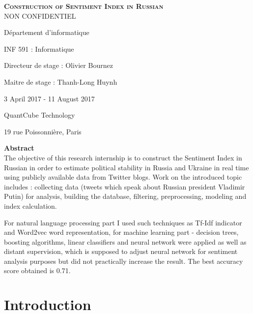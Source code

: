 \documentclass[12pt,a4paper]{article}
\begin{document}
\begin{titlepage}
\begin{center}
\textsc{\Large \textbf{Construction of Sentiment Index in Russian}} \\[1cm] 
\textsc{\LARGE NON CONFIDENTIEL}\\[3.5cm]
\end{center}

Département d’informatique

INF 591 : Informatique

Directeur de stage : Olivier Bournez

Maitre de stage : Thanh-Long Huynh

3 April 2017 - 11 August 2017

QuantCube Technology

19 rue Poissonnière, Paris
\end{titlepage}

\large \textbf{Abstract} \\[0.1cm] %

The objective of this research internship is to construct the Sentiment Index in Russian in order to estimate political stability in Russia and Ukraine in real time using publicly available data from Twitter blogs. Work on the introduced topic includes : collecting data (tweets which speak about Russian president Vladimir Putin) for analysis, building the database, filtering, preprocessing, modeling and index calculation.

For natural language processing part I used such techniques as Tf-Idf indicator and Word2vec word representation, for machine learning part - decision trees, boosting algorithms, linear classifiers and neural network were applied as well as distant supervision, which is supposed to adjust neural network for sentiment analysis purposes but did not practically increase the result. The best accuracy score obtained is 0.71.

\newpage
\tableofcontents
\newpage

\newpage
\section{Introduction}
\end{document}
